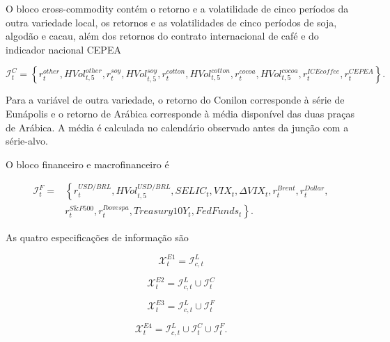 \documentclass[a4paper,fleqn]{cas-sc}
\begin{document}
O bloco cross-commodity contém o retorno e a volatilidade de cinco períodos da outra variedade local, os retornos e as volatilidades de cinco períodos de soja, algodão e cacau, além dos retornos do contrato internacional de café e do indicador nacional CEPEA

\begin{equation}
\mathcal{I}^{C}_{t}
=
\left\{
r^{other}_{t},HVol^{other}_{t,5},
r^{soy}_{t},HVol^{soy}_{t,5},
r^{cotton}_{t},HVol^{cotton}_{t,5},
r^{cocoa}_{t},HVol^{cocoa}_{t,5},
r^{ICEcoffee}_{t},r^{CEPEA}_{t}
\right\}.
\label{eq:cross_info}
\end{equation}

Para a variável de outra variedade, o retorno do Conilon corresponde à série de Eunápolis e o retorno de Arábica corresponde à média disponível das duas praças de Arábica. A média é calculada no calendário observado antes da junção com a série-alvo.

O bloco financeiro e macrofinanceiro é

\begin{equation}
\begin{aligned}
\mathcal{I}^{F}_{t}
={}&\left\{
r^{USD/BRL}_{t},HVol^{USD/BRL}_{t,5},
SELIC_{t},VIX_{t},\Delta VIX_{t},
r^{Brent}_{t},r^{Dollar}_{t}, \right.\\
&\left. r^{S\&P500}_{t},r^{Ibovespa}_{t},
Treasury10Y_{t},FedFunds_{t}
\right\}.
\end{aligned}
\label{eq:financial_info}
\end{equation}

As quatro especificações de informação são

\begin{equation}
\mathcal{X}^{E1}_{t}=\mathcal{I}^{L}_{c,t}
\label{eq:e1}
\end{equation}

\begin{equation}
\mathcal{X}^{E2}_{t}=\mathcal{I}^{L}_{c,t}\cup\mathcal{I}^{C}_{t}
\label{eq:e2}
\end{equation}

\begin{equation}
\mathcal{X}^{E3}_{t}=\mathcal{I}^{L}_{c,t}\cup\mathcal{I}^{F}_{t}
\label{eq:e3}
\end{equation}

\begin{equation}
\mathcal{X}^{E4}_{t}=\mathcal{I}^{L}_{c,t}\cup\mathcal{I}^{C}_{t}\cup\mathcal{I}^{F}_{t}.
\label{eq:e4}
\end{equation}
\end{document}
